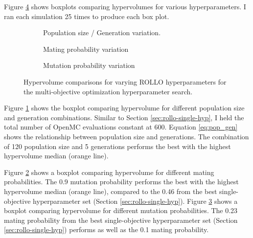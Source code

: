 Figure \ref{fig:hypervolume-comparison} shows boxplots comparing hypervolumes 
for various hyperparameters. 
I ran each simulation 25 times to produce each box plot. 
\begin{figure}[htbp]
    \centering
    \begin{subfigure}{0.55\textwidth}
    \caption{Population size / Generation variation.}
    \label{fig:hypervolume-comparison-gens}
    \end{subfigure}
    \begin{subfigure}{0.55\textwidth}
        \caption{Mating probability variation}
        \label{fig:hypervolume-comparison-matpb}
    \end{subfigure}
    \begin{subfigure}{0.55\textwidth}
        \caption{Mutation probability variation}
        \label{fig:hypervolume-comparison-mutpb}
    \end{subfigure}
    \caption{Hypervolume comparisons for varying \acrfull{ROLLO} hyperparameters for the
    multi-objective optimization hyperparameter search. }
    \label{fig:hypervolume-comparison}
\end{figure}
Figure \ref{fig:hypervolume-comparison-gens} shows the boxplot comparing hypervolume 
for different population size and generation combinations. 
Similar to Section \ref{sec:rollo-single-hyp}, I held the total number of OpenMC 
evaluations constant at 600. 
Equation \ref{eq:pop_gen} shows the relationship between population size and generations. 
The combination of 120 population size and 5 generations performs the best with the 
highest hypervolume median (orange line). 

Figure \ref{fig:hypervolume-comparison-matpb} shows a boxplot comparing hypervolume 
for different mating probabilities. 
The 0.9 mutation probability performs the best with the highest hypervolume median 
(orange line), compared to the 0.46 from the best single-objective hyperparameter set 
(Section \ref{sec:rollo-single-hyp}). 
Figure \ref{fig:hypervolume-comparison-mutpb} shows a boxplot comparing hypervolume 
for different mutation probabilities. 
The 0.23 mating probability from the best single-objective hyperparameter set 
(Section \ref{sec:rollo-single-hyp}) performs as well as the 0.1 mating probability. 

